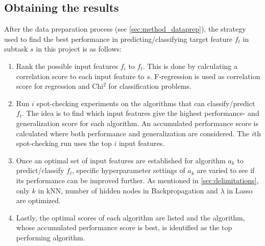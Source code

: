 	\subsection{Obtaining the results}
			After the data preparation process (see \ref{sec:method_dataprep}), the strategy used to find the best performance in predicting/classifying target feature $f_t$ in subtask $s$ in this project is as follows:
		\begin{enumerate}
			\item Rank the possible input features $f_i$ to $f_t$. This is done by calculating a correlation score to each input feature to $s$. F-regression is used as correlation score for regression and Chi$^2$ for classification problems.
			\item Run $i$ spot-checking experiments on the algorithms that can classify/predict $f_t$. The idea is to find which input features give the highest performance- and generalization score for each algorithm. An accumulated performance score is calculated where both performance and generalization are considered. The $i$th spot-checking run uses the top $i$ input features.
			\item Once an optimal set of input features are established for algorithm $a_k$ to predict/classify $f_t$, specific hyperparameter settings of $a_k$ are varied to see if its performance can be improved further. As mentioned in \ref{sec:delimitations}, only $k$ in kNN, number of hidden nodes in Backpropagation and $\lambda$ in Lasso are optimized.
			\item Lastly, the optimal scores of each algorithm are listed and the algorithm, whose accumulated performance score is best, is identified as the top performing algorithm.
		\end{enumerate}
		


